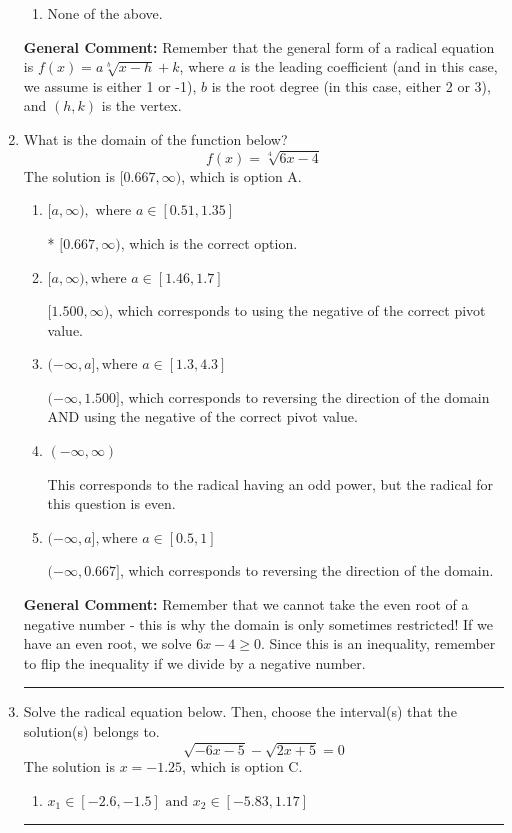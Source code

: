 \documentclass{extbook}[14pt]
\newcommand{\litem}[1]{\item #1

\rule{\textwidth}{0.4pt}}
\begin{document}
\begin{enumerate}
{\begin{enumerate}[label=\Alph*.]
\item None of the above.\end{enumerate}
\textbf{General Comment:} Remember that the general form of a radical equation is $ f(x) = a \sqrt[b]{x - h} + k $, where $a$ is the leading coefficient (and in this case, we assume is either 1 or -1), $b$ is the root degree (in this case, either 2 or 3), and $(h, k)$ is the vertex.
}
\litem{
What is the domain of the function below?
\[ f(x) = \sqrt[4]{6 x - 4} \]The solution is \( [0.667, \infty) \), which is option A.\begin{enumerate}[label=\Alph*.]
\item \( [a, \infty), \text{ where } a \in [0.51, 1.35] \)

* $[0.667, \infty)$, which is the correct option.
\item \( [a, \infty), \text{where } a \in [1.46, 1.7] \)

$[1.500, \infty)$, which corresponds to using the negative of the correct pivot value.
\item \( (-\infty, a], \text{where } a \in [1.3, 4.3] \)

$(-\infty, 1.500]$, which corresponds to reversing the direction of the domain AND using the negative of the correct pivot value.
\item \( (-\infty, \infty) \)

This corresponds to the radical having an odd power, but the radical for this question is even.
\item \( (-\infty, a], \text{where } a \in [0.5, 1] \)

 $(-\infty, 0.667]$, which corresponds to reversing the direction of the domain.
\end{enumerate}

\textbf{General Comment:} Remember that we cannot take the even root of a negative number - this is why the domain is only sometimes restricted! If we have an even root, we solve $6 x - 4 \geq 0$. Since this is an inequality, remember to flip the inequality if we divide by a negative number.
}
\litem{
Solve the radical equation below. Then, choose the interval(s) that the solution(s) belongs to.
\[ \sqrt{-6 x - 5} - \sqrt{2 x + 5} = 0 \]The solution is \( x = -1.25 \), which is option C.\begin{enumerate}[label=\Alph*.]
\item \( x_1 \in [-2.6, -1.5] \text{ and } x_2 \in [-5.83,1.17] \)


\end{enumerate}}
\end{enumerate}
\end{document}
